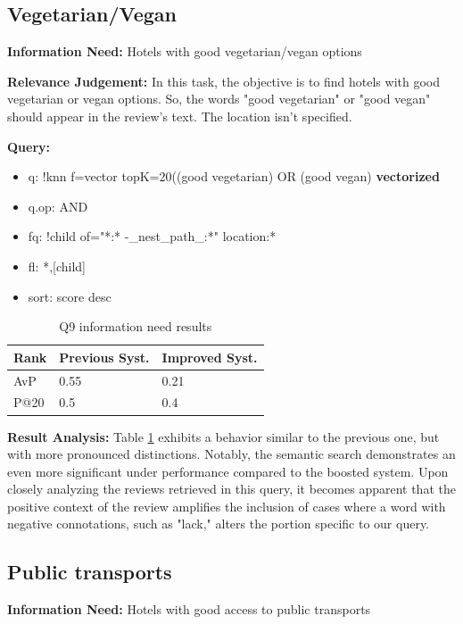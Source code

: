 \documentclass[sigconf]{acmart}
\begin{document}
\subsection{Vegetarian/Vegan}

\textbf{Information Need:} Hotels with good vegetarian/vegan options

\textbf{Relevance Judgement:} In this task, the objective is to find hotels with good vegetarian or vegan options. So, the words "good vegetarian" or "good vegan" should appear in the review's text. The location isn't specified.

\textbf{Query:}

\begin{itemize}
    \item q: {!knn f=vector topK=20}((good vegetarian) OR (good vegan) \textbf{vectorized}
    \item q.op: AND
    \item fq: {!child of="*:* -\_nest\_path\_:*"} location:*
    \item fl: *,[child]
    \item sort: score desc
\end{itemize}

\begin{table}[H]
\caption{Q9 information need results}
\label{tab:q9}
\begin{tabular}{lll}
\toprule
Rank & Previous Syst. & Improved Syst.\\
\midrule
AvP & 0.55 & 0.21  \\
P@20 & 0.5 & 0.4 \\
\bottomrule
\end{tabular}
\end{table}

\textbf{Result Analysis:} Table \ref{tab:q9} exhibits a behavior similar to the previous one, but with more pronounced distinctions. Notably, the semantic search demonstrates an even more significant under performance compared to the boosted system. 
Upon closely analyzing the reviews retrieved in this query, it becomes apparent that the positive context of the review amplifies the inclusion of cases where a word with negative connotations, such as "lack," alters the portion specific to our query.
\subsection{Public transports}

\textbf{Information Need:} Hotels with good access to public transports
\end{document}

